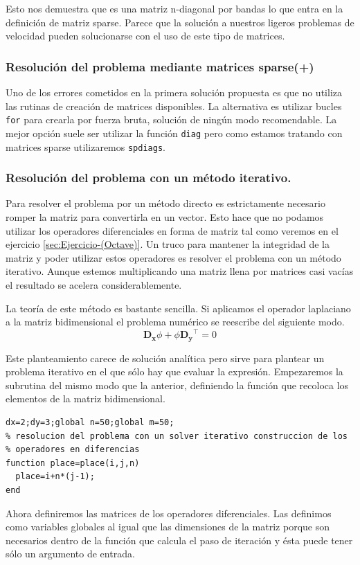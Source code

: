 Esto nos demuestra que es una matriz n-diagonal por bandas lo que
entra en la definición de matriz sparse. Parece que la solución a
nuestros ligeros problemas de velocidad pueden solucionarse con el uso
de este tipo de matrices.


\subsubsection{Resolución del problema mediante matrices sparse(+)}

Uno de los errores cometidos en la primera solución propuesta es que
no utiliza las rutinas de creación de matrices disponibles. La
alternativa es utilizar bucles \texttt{for} para crearla por fuerza
bruta, solución de ningún modo recomendable. La mejor opción suele ser
utilizar la función \texttt{diag} pero como estamos tratando con
matrices sparse utilizaremos \texttt{spdiags}.


\subsubsection{Resolución del problema con un método iterativo.}

Para resolver el problema por un método directo es estrictamente
necesario romper la matriz para convertirla en un vector. Esto hace
que no podamos utilizar los operadores diferenciales en forma de
matriz tal como veremos en el ejercicio \ref{sec:Ejercicio-(Octave)}.
Un truco para mantener la integridad de la matriz y poder utilizar
estos operadores es resolver el problema con un método iterativo.
Aunque estemos multiplicando una matriz llena por matrices casi vacías
el resultado se acelera considerablemente.

La teoría de este método es bastante sencilla. Si aplicamos el
operador laplaciano a la matriz bidimensional el problema numérico se
reescribe del siguiente modo.$$
\mathbf{D_{x}}\phi+\phi\mathbf{D_{y}}^{\top}=0$$


Este planteamiento carece de solución analítica pero sirve para
plantear un problema iterativo en el que sólo hay que evaluar la
expresión.  Empezaremos la subrutina del mismo modo que la anterior,
definiendo la función que recoloca los elementos de la matriz
bidimensional.

\begin{verbatim}
dx=2;dy=3;global n=50;global m=50;
% resolucion del problema con un solver iterativo construccion de los
% operadores en diferencias
function place=place(i,j,n)
  place=i+n*(j-1);
end
\end{verbatim}
Ahora definiremos las matrices de los operadores diferenciales. Las
definimos como variables globales al igual que las dimensiones de la
matriz porque son necesarios dentro de la función que calcula el paso
de iteración y ésta puede tener sólo un argumento de entrada.


